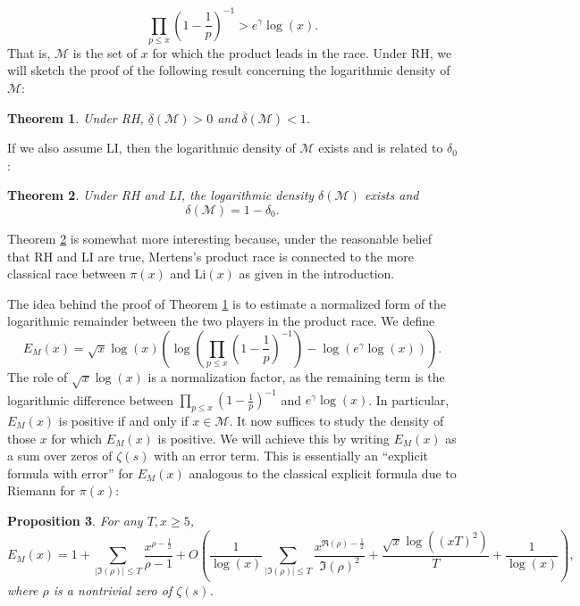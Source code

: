 \documentclass[12pt,reqno]{amsart}
\newtheorem{theorem}{Theorem}[section]
\newtheorem{proposition}[theorem]{Proposition}
\theoremstyle{definition}
\numberwithin{equation}{section}
\begin{document}
    \begin{equation}\label{equ:lead_in_Mertens's_product_race}
        \prod_{p \le x}\left(1-\frac{1}{p}\right)^{-1} > e^{\gamma}\log(x).
    \end{equation}
    That is, $\mathcal{M}$ is the set of $x$ for which the product leads in the race. Under RH, we will sketch the proof of the following result concerning the logarithmic density of $\mathcal{M}$:

    \begin{theorem}\label{thm:prelim_densities_of_Mertens's_product_race}
        Under RH, $\underline{\delta}(\mathcal{M}) > 0$ and $\overline{\delta}(\mathcal{M}) < 1$.
    \end{theorem}

    If we also assume LI, then the logarithmic density of $\mathcal{M}$ exists and is related to $\delta_{0}$:
    \begin{theorem}\label{thm:density_of_Mertens's_product_race}
        Under RH and LI, the logarithmic density $\delta(\mathcal{M})$ exists and
        \[
            \delta(\mathcal{M}) = 1-\delta_{0}.
        \]
    \end{theorem}

    Theorem \ref{thm:density_of_Mertens's_product_race} is somewhat more interesting because, under the reasonable belief that RH and LI are true, Mertens's product race is connected to the more classical race between $\pi(x)$ and $\mathrm{Li}(x)$ as given in the introduction.

    The idea behind the proof of Theorem \ref{thm:prelim_densities_of_Mertens's_product_race} is to estimate a normalized form of the logarithmic remainder between the two players in the product race. We define
    \[
        E_{M}(x) = \sqrt{x}\log(x)\left(\log\left(\prod_{p \le x}\left(1-\frac{1}{p}\right)^{-1}\right)-\log(e^{\gamma}\log(x))\right).
    \]
    The role of $\sqrt{x}\log(x)$ is a normalization factor, as the remaining term is the logarithmic difference between $\prod_{p \le x}\left(1-\frac{1}{p}\right)^{-1}$ and $e^{\gamma}\log(x)$. In particular, $E_{M}(x)$ is positive if and only if $x \in \mathcal{M}$. It now suffices to study the density of those $x$ for which $E_{M}(x)$ is positive. We will achieve this by writing $E_{M}(x)$ as a sum over zeros of $\zeta(s)$ with an error term. This is essentially an ``explicit formula with error'' for $E_{M}(x)$ analogous to the classical explicit formula due to Riemann for $\pi(x)$:

    \begin{proposition}\label{prop:exact_formula_with_error_for_E}
        For any $T,x \ge 5$,
        \[
            E_{M}(x) = 1+\sum_{|\Im(\rho)| \le T}\frac{x^{\rho-\frac{1}{2}}}{\rho-1}+O\left(\frac{1}{\log(x)}\sum_{|\Im(\rho)| \le T}\frac{x^{\Re(\rho)-\frac{1}{2}}}{\Im(\rho)^{2}}+\frac{\sqrt{x}\log((xT)^{2})}{T}+\frac{1}{\log(x)}\right),
        \]
        where $\rho$ is a nontrivial zero of $\zeta(s)$.
    \end{proposition}
\end{document}
